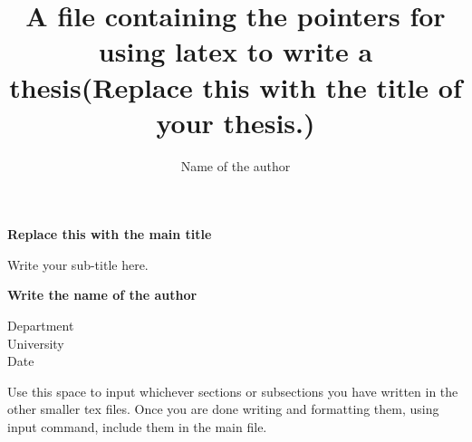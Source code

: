 \documentclass[twocolumn]{article} %
\title{A file containing the pointers for using latex to write a thesis(Replace this with the title of your thesis.)}
\author{Name of the author}
\begin{document}
\begin{titlepage}
    \begin{center}
        \vspace*{1cm}
 
        \textbf{Replace this with the main title}
 
        \vspace{0.5cm}
         Write your sub-title here. 
             
        \vspace{1.5cm}
 
        \textbf{Write the name of the author}
 
        \vfill
             
        \vspace{0.8cm}
      
             
        Department\\
        University\\
        Date
             
    \end{center}
 \end{titlepage}

Use this space to input whichever sections or subsections you have written in the other smaller tex files. Once you are done writing and formatting them, using input command, include them in the main file. 








\pagebreak


\end{document}

